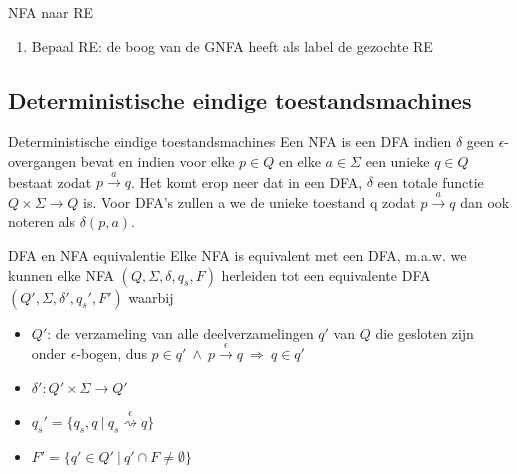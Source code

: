 \begin{alg}[NFA $\to$ RE]{NFA naar RE}
\begin{enumerate}
\begin{minipage}{.43\textwidth}
            \end{minipage}
        \item Bepaal RE: de boog van de GNFA heeft als label de gezochte RE
    \end{enumerate}
\end{alg}

\newpage

\subsection{Deterministische eindige toestandsmachines}

\vspace{0.5cm}

\begin{theo}{Deterministische eindige toestandsmachines}
    Een NFA is een DFA indien \(\delta\) geen \(\epsilon\)-overgangen bevat en 
    indien voor elke \(p \in Q\) en elke \(a \in \Sigma\) een unieke \(q \in Q\) 
    bestaat zodat \(p \overset{a}{\to} q\). Het komt erop neer dat in een DFA, \(\delta\) 
    een totale functie $Q \times \Sigma \to Q$ is. Voor DFA's zullen a
    we de unieke toestand q zodat \(p \overset{a}{\to} q\) dan ook noteren als \(\delta(p,a)\).
\end{theo}

\begin{lem}{DFA en NFA equivalentie}
    Elke NFA is equivalent met een DFA, m$.$a$.$w$.$ we kunnen elke NFA \((Q, \Sigma, \delta, q_s, F)\) herleiden tot een
    equivalente DFA \((Q', \Sigma, \delta', q_s', F')\) waarbij
    \begin{itemize}
        \item \(Q'\): de verzameling van alle deelverzamelingen $q'$ van $Q$ die gesloten zijn onder \(\epsilon\)-bogen, dus
              \(p \in q' \ \wedge \ p \overset{\epsilon}{\to} q \ \Rightarrow \ q \in q'\)
        \item \(\delta': Q' \times \Sigma \rightarrow Q'\)
        \item \(q_{s}' = \{q_s,q \ | \ q_s \overset{\epsilon}{\rightsquigarrow} q \}\)
        \item \(F' = \{q' \in Q' \ | \ q' \cap F \neq \emptyset \}\)
    \end{itemize}
    \vspace{-0.3cm}
\end{lem}

